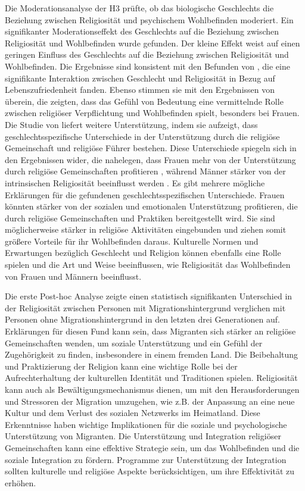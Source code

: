Die Moderationsanalyse der H3 prüfte, ob das biologische Geschlechts die Beziehung zwischen Religiosität und psychischem Wohlbefinden moderiert. Ein signifikanter Moderationseffekt des Geschlechts auf die Beziehung zwischen Religiosität und Wohlbefinden wurde gefunden. Der kleine Effekt weist auf einen geringen Einfluss des Geschlechts auf die Beziehung zwischen Religiosität und Wohlbefinden. 
Die Ergebnisse sind konsistent mit den Befunden von \textcite{KoenigShohaib2023}, die eine signifikante Interaktion zwischen Geschlecht und Religiosität in Bezug auf Lebenszufriedenheit fanden. Ebenso stimmen sie mit den Ergebnissen von \textcite{DarIqbal2019} überein, die zeigten, dass das Gefühl von Bedeutung eine vermittelnde Rolle zwischen religiöser Verpflichtung und Wohlbefinden spielt, besonders bei Frauen.
Die Studie von \textcite{LazarBjorck2016} liefert weitere Unterstützung, indem sie aufzeigt, dass geschlechtsspezifische Unterschiede in der Unterstützung durch die religiöse Gemeinschaft und religiöse Führer bestehen. Diese Unterschiede spiegeln sich in den Ergebnissen wider, die nahelegen, dass Frauen mehr von der Unterstützung durch religiöse Gemeinschaften profitieren \parencite{DarIqbal2019}, während Männer stärker von der intrinsischen Religiosität beeinflusst werden \parencite{KoenigShohaib2023}.
Es gibt mehrere mögliche Erklärungen für die gefundenen geschlechtsspezifischen Unterschiede. Frauen könnten stärker von der sozialen und emotionalen Unterstützung profitieren, die durch religiöse Gemeinschaften und Praktiken bereitgestellt wird. Sie sind möglicherweise stärker in religiöse Aktivitäten eingebunden und ziehen somit größere Vorteile für ihr Wohlbefinden daraus. Kulturelle Normen und Erwartungen bezüglich Geschlecht und Religion können ebenfalls eine Rolle spielen und die Art und Weise beeinflussen, wie Religiosität das Wohlbefinden von Frauen und Männern beeinflusst. 


Die erste Post-hoc Analyse zeigte einen statistisch signifikanten Unterschied in der Religiosität zwischen Personen mit Migrationshintergrund verglichen mit Personen ohne Migrationshintergrund in den letzten drei Generationen auf.
Erklärungen für diesen Fund kann sein, dass Migranten sich stärker an religiöse Gemeinschaften wenden, um soziale Unterstützung und ein Gefühl der Zugehörigkeit zu finden, insbesondere in einem fremden Land. Die Beibehaltung und Praktizierung der Religion kann eine wichtige Rolle bei der Aufrechterhaltung der kulturellen Identität und Traditionen spielen. Religiosität kann auch als Bewältigungsmechanismus dienen, um mit den Herausforderungen und Stressoren der Migration umzugehen, wie z.B. der Anpassung an eine neue Kultur und dem Verlust des sozialen Netzwerks im Heimatland. Diese Erkenntnisse haben wichtige Implikationen für die soziale und psychologische Unterstützung von Migranten. Die Unterstützung und Integration religiöser Gemeinschaften kann eine effektive Strategie sein, um das Wohlbefinden und die soziale Integration zu fördern. Programme zur Unterstützung der Integration sollten kulturelle und religiöse Aspekte berücksichtigen, um ihre Effektivität zu erhöhen. 

